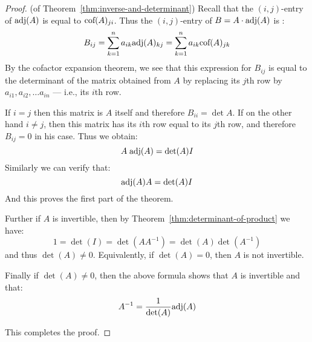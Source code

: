 \begin{proof} (of Theorem~\ref{thm:inverse-and-determinant})
Recall that the $(i,j)$-entry of $\mbox{\rm adj}(A)$ is equal to $\mbox{\rm cof}(A)_{ji}$.  Thus the $(i,j)$-entry of   $B=A\cdot \mbox{\rm adj}(A)$ is : 
\[
B_{ij}=\sum_{k=1}^n a_{ik} \mbox{\rm adj} (A)_{kj}= \sum_{k=1}^n a_{ik} \mbox{\rm cof} (A)_{jk}
\]
By the cofactor expansion theorem, we see that this expression for $B_{ij}$ is equal to the determinant of the
matrix obtained from $A$ by replacing its $j$th  row  by $a_{i1}, a_{i2}, \dots a_{in}$ --- i.e., its $i$th row. 

If $i=j$ then this matrix is $A$ itself and therefore $B_{ii}=\det
A$. If on the other hand $i\neq j$, then this matrix has its $i$th row
equal to its $j$th row, and therefore $B_{ij}=0$ in his case. Thus we obtain: 
\begin{equation*}
A \; \mbox{\rm adj}(A) = {\det (A)} I
\end{equation*}
Similarly we can verify that:
\begin{equation*}
\mbox{\rm adj}(A)A = {\det (A)} I
\end{equation*}
And this proves the first part of the theorem. 

Further if $A$ is  invertible, then by Theorem~\ref{thm:determinant-of-product} we have:
\[ 1 = \det (I) = \det (A A^{-1}) = \det (A) \det (A^{-1}) \]
and thus $\det (A) \neq 0$. Equivalently, if  $\det (A) = 0$, then $A$ is not invertible. 

Finally if $\det (A) \neq 0$, then the above formula shows that $A$ is invertible and that:
\begin{equation*}
A^{-1} = \frac{1}{\det (A)} \mbox{\rm adj}(A)
\end{equation*}

This completes the proof.
\end{proof}


